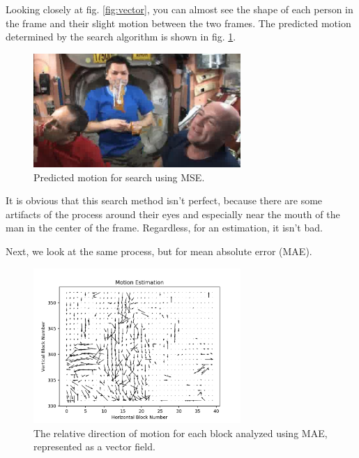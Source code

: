 \documentclass[11pt,a4paper]{article}
\begin{document}
Looking closely at fig. \ref{fig:vector}, you can almost see the shape of each person in the frame and their slight motion between the two frames. The predicted motion determined by the search algorithm is shown in fig. \ref{fig:predicted}.

\pagebreak

\begin{figure}[ht]
	\centering
	\includegraphics[width=0.7\textwidth]{predicted}
	\caption{Predicted motion for search using MSE.}
	\label{fig:predicted}
\end{figure}

It is obvious that this search method isn't perfect, because there are some artifacts of the process around their eyes and especially near the mouth of the man in the center of the frame. Regardless, for an estimation, it isn't bad.

\pagebreak

Next, we look at the same process, but for mean absolute error (MAE). 

\begin{figure}[ht]
	\centering
	\includegraphics[width=0.7\textwidth]{vector_field1}
	\caption{The relative direction of motion for each block analyzed using MAE, represented as a vector field.}
	\label{fig:vector1}
\end{figure}
\end{document}
